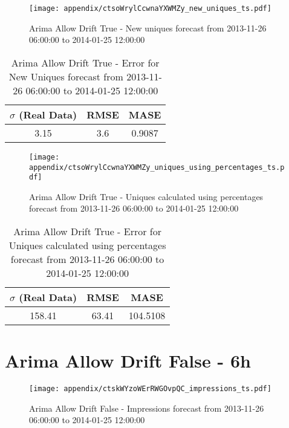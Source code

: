 \begin{figure}[H] \begin{center} \leavevmode
\texttt{[image: appendix/ctsoWrylCcwnaYXWMZy\_new\_uniques\_ts.pdf]} \caption{
Arima Allow Drift True - New uniques forecast from 2013-11-26 06:00:00 to 2014-01-25 12:00:00} \label{fig:appendix/ctsoWrylCcwnaYXWMZy_new_uniques_ts.pdf} \end{center}
\end{figure}

\begin{table}[H]
\centering
\footnotesize
\begin{tabular}{ccc}
$\sigma$ (Real Data) & RMSE & MASE   \\ \hline
3.15 & 3.6 & 0.9087 \\
\end{tabular}

\vspace{0.5cm}

\caption{
Arima Allow Drift True - Error for New Uniques forecast from 2013-11-26 06:00:00 to 2014-01-25 12:00:00}
\end{table}

\begin{figure}[H] \begin{center} \leavevmode
\texttt{[image: appendix/ctsoWrylCcwnaYXWMZy\_uniques\_using\_percentages\_ts.pdf]} \caption{
Arima Allow Drift True - Uniques calculated using percentages forecast from 2013-11-26 06:00:00 to 2014-01-25 12:00:00} \label{fig:appendix/ctsoWrylCcwnaYXWMZy_uniques_using_percentages_ts.pdf} \end{center}
\end{figure}

\begin{table}[H]
\centering
\footnotesize
\begin{tabular}{ccc}
$\sigma$ (Real Data) & RMSE & MASE   \\ \hline
158.41 & 63.41 & 104.5108 \\
\end{tabular}

\vspace{0.5cm}

\caption{
Arima Allow Drift True - Error for Uniques calculated using percentages forecast from 2013-11-26 06:00:00 to 2014-01-25 12:00:00}
\end{table}

\section{Arima Allow Drift False - 6h}
\begin{figure}[H] \begin{center} \leavevmode
\texttt{[image: appendix/ctskWYzoWErRWGOvpQC\_impressions\_ts.pdf]} \caption{
Arima Allow Drift False - Impressions forecast from 2013-11-26 06:00:00 to 2014-01-25 12:00:00} \label{fig:appendix/ctskWYzoWErRWGOvpQC_impressions_ts.pdf} \end{center}
\end{figure}

